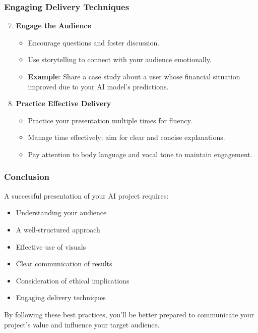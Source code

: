 \documentclass{beamer}
\begin{document}
\begin{frame}[fragile]
    \frametitle{Engaging Delivery Techniques}
    \begin{enumerate}
        \setcounter{enumi}{6} %
        
        \item \textbf{Engage the Audience}
            \begin{itemize}
                \item Encourage questions and foster discussion.
                \item Use storytelling to connect with your audience emotionally.
                    \item \textbf{Example}: Share a case study about a user whose financial situation improved due to your AI model’s predictions.
            \end{itemize}
        
        \item \textbf{Practice Effective Delivery}
            \begin{itemize}
                \item Practice your presentation multiple times for fluency.
                \item Manage time effectively; aim for clear and concise explanations.
                \item Pay attention to body language and vocal tone to maintain engagement.
            \end{itemize}
    \end{enumerate}
\end{frame}

\begin{frame}[fragile]
    \frametitle{Conclusion}
    A successful presentation of your AI project requires:
    \begin{itemize}
        \item Understanding your audience
        \item A well-structured approach
        \item Effective use of visuals
        \item Clear communication of results
        \item Consideration of ethical implications
        \item Engaging delivery techniques
    \end{itemize}
    By following these best practices, you'll be better prepared to communicate your project's value and influence your target audience.
\end{frame}
\end{document}
